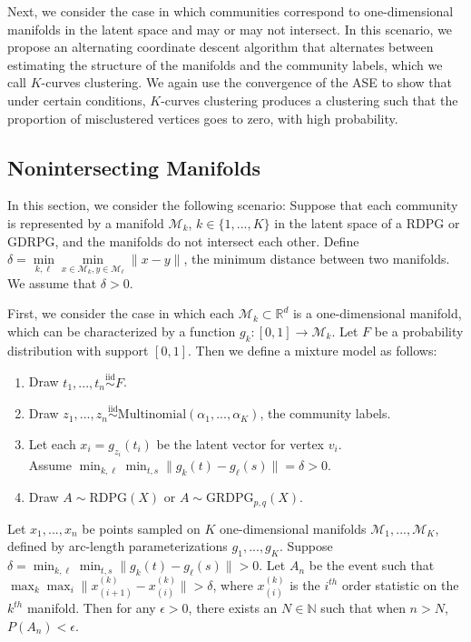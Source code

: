 \documentclass[12pt]{article}
\providecommand{\tightlist}{%
  \setlength{\itemsep}{0pt}\setlength{\parskip}{0pt}}
\begin{document}
Next, we consider the case in which communities correspond to
one-dimensional manifolds in the latent space and may or may not
intersect. In this scenario, we propose an alternating coordinate
descent algorithm that alternates between estimating the structure of
the manifolds and the community labels, which we call \(K\)-curves
clustering. We again use the convergence of the ASE to show that under
certain conditions, \(K\)-curves clustering produces a clustering such
that the proportion of misclustered vertices goes to zero, with high
probability.

\hypertarget{nonintersecting-manifolds}{%
\subsection{Nonintersecting Manifolds}\label{nonintersecting-manifolds}}

In this section, we consider the following scenario: Suppose that each
community is represented by a manifold \(\mathcal{M}_k\),
\(k \in \{1, ..., K\}\) in the latent space of a RDPG or GDRPG, and the
manifolds do not intersect each other. Define
\(\delta = \min\limits_{k, \ell} \min\limits_{x \in \mathcal{M}_k, y \in \mathcal{M}_\ell} \|x - y\|\),
the minimum distance between two manifolds. We assume that
\(\delta > 0\).

First, we consider the case in which each
\(\mathcal{M}_k \subset \mathbb{R}^d\) is a one-dimensional manifold,
which can be characterized by a function
\(g_k : [0, 1] \to \mathcal{M}_k\). Let \(F\) be a probability
distribution with support \([0, 1]\). Then we define a mixture model as
follows:

\begin{enumerate}
\def\labelenumi{\arabic{enumi}.}
\tightlist
\item
  Draw \(t_1, ..., t_n \stackrel{\mathrm{iid}}{\sim}F\).
\item
  Draw
  \(z_1, ..., z_n \stackrel{\mathrm{iid}}{\sim}\mathrm{Multinomial}(\alpha_1, ..., \alpha_K)\),
  the community labels.
\item
  Let each \(x_i = g_{z_i}(t_i)\) be the latent vector for vertex
  \(v_i\).\\
  Assume
  \(\min_{k, \ell} \min_{t, s} \|g_k(t) - g_\ell(s)\| = \delta > 0\).
\item
  Draw \(A \sim \mathrm{RDPG}(X)\) or
  \(A \sim \mathrm{GRDPG}_{p,q}(X)\).
\end{enumerate}

\begin{theorem}
\label{nonintersect-no-noise}
Let $x_1, ..., x_n$ be points sampled on $K$ one-dimensional manifolds $\mathcal{M}_1, ..., \mathcal{M}_K$, defined by arc-length parameterizations $g_1, ..., g_K$. 
Suppose $\delta = \min_{k, \ell} \min_{t, s} \| g_k(t) - g_\ell(s) \| > 0$. 
Let $A_n$ be the event such that $\max_k \max_i \|x_{(i+1)}^{(k)} - x_{(i)}^{(k)}\| > \delta$, where $x_{(i)}^{(k)}$ is the $i^{th}$ order statistic on the $k^{th}$ manifold. 
Then for any $\epsilon > 0$, there exists an $N \in \mathbb{N}$ such that when $n > N$, $P(A_n) < \epsilon$. 
\end{theorem}
\end{document}
